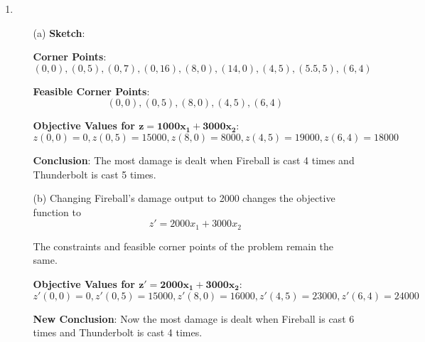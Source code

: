 \documentclass{article}[12pt,a4paper]
\begin{document}
  \begin{enumerate}
  
  \item
  \begin{enumerate}
   \item[(a)] 
   \textbf{Sketch}: \newline{}
   
   \begin{center}
   \end{center}
   
   \textbf{Corner Points}: 
   $$(0,0), (0,5), (0, 7), (0, 16), (8,0), (14,0), (4,5), (5.5,5), (6,4)$$
   
   \textbf{Feasible Corner Points}:
   $$(0,0), (0,5),  (8,0), (4,5), (6,4)$$
   
   \textbf{Objective Values for $\mathbf{z = 1000x_1 + 3000x_2}$}:
   $$z(0,0) = 0, z(0,5) = 15000, z(8,0) = 8000, z(4,5) = 19000, z(6,4) = 18000$$
   
   \textbf{Conclusion}: The most damage is dealt when Fireball is cast 4 times and Thunderbolt is cast 5 times. \newline{}
   
   \item[(b)] Changing Fireball's damage output to 2000 changes the objective function to
   $$z' = 2000x_1 + 3000x_2$$
   
  The constraints and feasible corner points of the problem remain the same. \newline
  
   \textbf{Objective Values for $\mathbf{z' = 2000x_1 + 3000x_2}$}:
   $$z'(0,0) = 0, z'(0,5) = 15000, z'(8,0) = 16000, z'(4,5) = 23000, z'(6,4) = 24000$$
   
   \textbf{New Conclusion}: Now the most damage is dealt when Fireball is cast 6 times and Thunderbolt is cast 4 times. \newline{}
   

\end{enumerate}
\end{enumerate}
\end{document}
